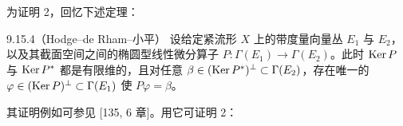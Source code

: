 为证明 2，回忆下述定理：

\begin{theorem}{9.15.4（Hodge--de Rham--小平）}
  设给定紧流形 $X$ 上的带度量向量丛 $E_1$ 与 $E_2$，以及其截面空间之间的椭圆型线性微分算子 $P\colon\Gamma(E_1)\to\Gamma(E_2)$。此时 $\operatorname{Ker} P$ 与 $\operatorname{Ker} P^*$ 都是有限维的，且对任意 $\beta\in(\operatorname{Ker} P^*)^\perp\subset\Gamma(E_2)$，存在唯一的 $\varphi\in(\operatorname{Ker} P)^\perp\subset\Gamma(E_1)$ 使 $P\varphi=\beta$。
\end{theorem}


其证明例如可参见 [135, 6 章]。用它可证明 2：

